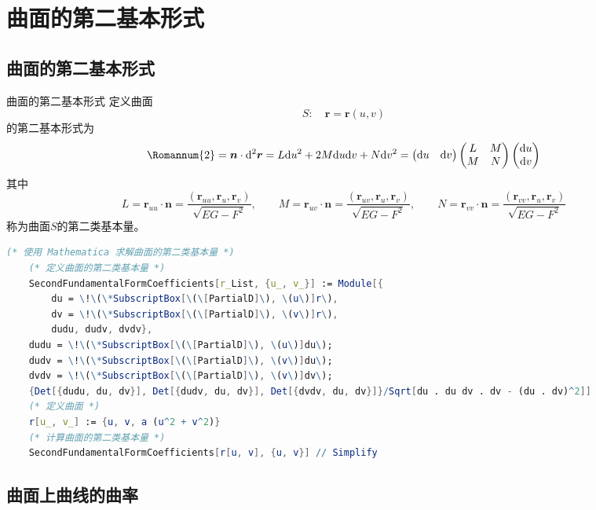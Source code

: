 \documentclass[lang = cn, scheme = chinese, thmcnt = section]{elegantbook}
\newcommand{\bs}{\boldsymbol}          %
\newcommand{\dd}{\mathrm{d}}           %
\begin{document}
\section{曲面的第二基本形式}

\subsection{曲面的第二基本形式}

\begin{definition}{曲面的第二基本形式}
	定义曲面
	$$
	S:\quad \bs{r}=\bs{r}(u,v)
	$$
	的第二基本形式为%
	$$
	{\rm\Romannum{2}}
	=\bs{n}\cdot\dd^2\bs{r}
	=L\dd u^2+2M\dd u\dd v+N\dd v^2=
	\begin{pmatrix}
		\dd u & \dd v
	\end{pmatrix}
	\begin{pmatrix}
		L & M\\
		M & N
	\end{pmatrix}
	\begin{pmatrix}
		\dd u \\ \dd v
	\end{pmatrix}
	$$
	其中%
	$$
	L=\bs{r}_{uu}\cdot\bs{n}=\frac{(\bs{r}_{uu},\bs{r}_u,\bs{r}_v)}{\sqrt{EG-F^2}},\qquad 
	M=\bs{r}_{uv}\cdot\bs{n}=\frac{(\bs{r}_{uv},\bs{r}_u,\bs{r}_v)}{\sqrt{EG-F^2}},\qquad 
	N=\bs{r}_{vv}\cdot\bs{n}=\frac{(\bs{r}_{vv},\bs{r}_u,\bs{r}_v)}{\sqrt{EG-F^2}}
	$$
	称为曲面$S$的第二类基本量。
\end{definition}

\begin{lstlisting}[language = Mathematica]
	(* 使用 Mathematica 求解曲面的第二类基本量 *)
	(* 定义曲面的第二类基本量 *)
	SecondFundamentalFormCoefficients[r_List, {u_, v_}] := Module[{
		du = \!\(\*SubscriptBox[\(\[PartialD]\), \(u\)]r\), 
		dv = \!\(\*SubscriptBox[\(\[PartialD]\), \(v\)]r\), 
		dudu, dudv, dvdv}, 
	dudu = \!\(\*SubscriptBox[\(\[PartialD]\), \(u\)]du\); 
	dudv = \!\(\*SubscriptBox[\(\[PartialD]\), \(v\)]du\); 
	dvdv = \!\(\*SubscriptBox[\(\[PartialD]\), \(v\)]dv\); 
	{Det[{dudu, du, dv}], Det[{dudv, du, dv}], Det[{dvdv, du, dv}]}/Sqrt[du . du dv . dv - (du . dv)^2]]
	(* 定义曲面 *)
	r[u_, v_] := {u, v, a (u^2 + v^2)}
	(* 计算曲面的第二类基本量 *)
	SecondFundamentalFormCoefficients[r[u, v], {u, v}] // Simplify
\end{lstlisting}

\subsection{曲面上曲线的曲率}
\end{document}
